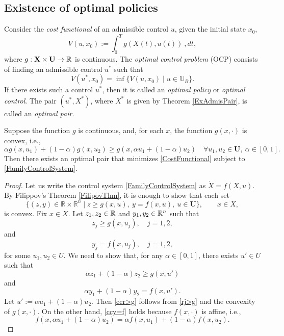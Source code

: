 \subsection{Existence of optimal policies}
Consider the  {\it cost functional} of an admissible control $u$, given the initial state $x_0$, 
\begin{equation}\label{CostFunctional} 
    V(u,x_0) := \int_0 ^ T g(X(t), u(t)) \ ,dt,
\end{equation}
%
where $g: \mathbf{X} \times \mathbf{U} \to \mathbb{R}$ is continuous. 
The {\it optimal control problem} (OCP) consists of finding an admissible control $u^\ast$ such that
\[ V(u^\ast,x_0)=\inf\{ V(u,x_0)\mid u\in \mathbb{U}_B \}.\]
If there exists such a control $u^\ast$, then it is called an 
{\it optimal policy} or {\it optimal control}. 
The pair $(u^\ast,X^\ast)$, where $X^\ast$ is given by 
Theorem \ref{ExAdmisPair}, is called an {\it optimal pair}.

\begin{theorem} 
Suppose the function $g$ is continuous, and, for each $x$,  
the function $g(x,\cdot)$ is convex, i.e.,
\[  
    \alpha g(x,u_1) +(1-\alpha) g(x,u_2) \geq g(x,\alpha u_1+(1-\alpha)u_2) \quad \forall u_1,u_2\in\mathbf{U},\  \alpha\in [0,1]. 
\]
Then there exists an optimal pair that minimizes \eqref{CostFunctional} subject to \eqref{FamilyControlSystem}. 
\end{theorem}
\begin{proof}
    Let us write the control system \eqref{FamilyControlSystem} as $\dot{X}=f(X,u)$. 
    By Filippov's Theorem \ref{FilipovThm}, it is enough to show that each set   
    \[ 
        \{ (z, y)\in \mathbb{R}\times \mathbb{R}^n\mid  
        z \geq g(x,u), \  y=f(x,u), \ u\in \mathbf{U}\},\qquad x\in X,
     \]  
    is convex. Fix $x\in X$. Let  $z_1,z_2\in \mathbb{R}$ and  $y_1,y_2\in \mathbb{R}^n$ such that
    \begin{equation}\label{rj>g}
         z_j\geq g(x,u_j),\quad   j=1,2, 
    \end{equation}
    and 
    \begin{equation}\label{yj=f}
        y_j=f(x,u_j),\quad j=1,2, 
    \end{equation}
    for some $u_1,u_2\in U$. 
    We need to show that, for any $\alpha\in[0,1]$, there exists $u'\in U$ such that
    \begin{equation}\label{ccr>g}
    \alpha z_1 + (1-\alpha)z_2 \geq g(x,u') \end{equation}
    and 
    \begin{equation}\label{ccy=f}
        \alpha y_1 + (1-\alpha)y_2 = f(x,u'). 
    \end{equation}
    Let $u':=\alpha u_1 + (1-\alpha)u_2$. 
    Then \eqref{ccr>g} follows from \eqref{rj>g} and the convexity of $g(x,\cdot)$. 
    On the other hand, \eqref{ccy=f} holds because $f(x,\cdot)$ is affine, i.e.,  
    \[ 
        f(x,\alpha u_1+(1-\alpha)u_2) 
        = \alpha f(x,u_1) +(1-\alpha) f(x,u_2). 
    \]
\end{proof}

